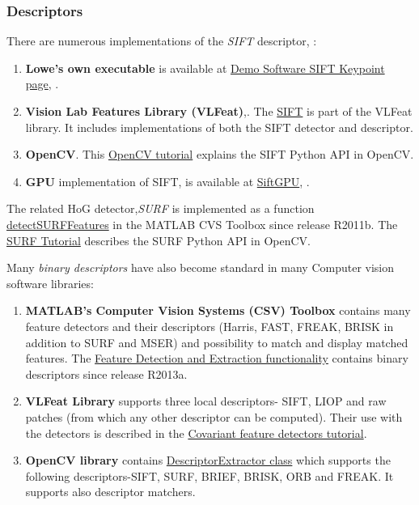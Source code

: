 {\subsubsection{Descriptors}

There are numerous implementations of the {\em SIFT} descriptor, \cite{Lowe:2004}:
\begin{enumerate}
\item{\bf Lowe's own executable} is available at \href{http://www.cs.ubc.ca/~lowe/keypoints/}{Demo Software SIFT Keypoint page}, \cite{lowe_sift_soft}.
\item{\bf Vision Lab Features Library (VLFeat)},\cite{vlfeat_soft}. The \href{http://www.vlfeat.org/api/sift.html}{SIFT} is part of the VLFeat library. It includes implementations of both the SIFT detector and descriptor.
\item{\bf OpenCV}. This \href{http://docs.opencv.org/master/da/df5/tutorial_py_sift_intro.html}{OpenCV tutorial} explains the SIFT Python API in OpenCV.
\item{\bf GPU} implementation of SIFT, \cite{Sinha06gpu-basedvideo} is available at \href{http://cs.unc.edu/~ccwu/siftgpu/}{SiftGPU}, \cite{sift_gpu_soft}. 
\end{enumerate}

The related HoG detector,{\em SURF}  is implemented as a function \href{http://nl.mathworks.com/help/vision/ref/detectsurffeatures.html}{\textsf{detectSURFFeatures}} in the MATLAB CVS Toolbox since release R2011b. The \href{http://docs.opencv.org/master/df/dd2/tutorial_py_surf_intro.html}{SURF Tutorial} describes the SURF Python API in OpenCV.

Many {\em binary descriptors} have also become standard in many Computer vision software libraries:
\begin{enumerate}
\item{\bf MATLAB's Computer Vision Systems (CSV) Toolbox} contains many feature detectors and their descriptors (Harris, FAST, FREAK, BRISK in addition to SURF and MSER) and possibility to match and display matched features. The \href{http://nl.mathworks.com/help/vision/feature-detection-extraction-and-matching.html}{Feature Detection and Extraction functionality} contains binary descriptors since release R2013a.
\item{\bf} {\bf VLFeat Library} supports three local descriptors- SIFT, LIOP and raw patches (from which any other descriptor can be computed). Their use with the  detectors is described in the \href{http://www.vlfeat.org/overview/covdet.html}{Covariant feature detectors tutorial}. 
\item{\bf} {\bf OpenCV library} contains \href{http://docs.opencv.org/modules/features2d/doc/common_interfaces_of_descriptor_extractors.html?highlight=descriptorextractor#descriptorextractor}{\textsf{DescriptorExtractor class}} which supports the following descriptors-SIFT, SURF, BRIEF, BRISK, ORB and FREAK. It supports also descriptor matchers.
\end{enumerate}

}

